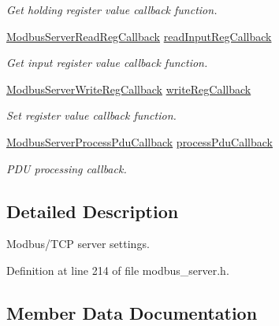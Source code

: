 \begin{DoxyCompactItemize}
\begin{DoxyCompactList}\small\item\em Get holding register value callback function. \end{DoxyCompactList}\item 
\hyperlink{modbus__server_8h_a3d9a52f0b248469bb1e36927cdb5ce91}{Modbus\+Server\+Read\+Reg\+Callback} \hyperlink{structModbusServerSettings_a1657429226ae26f0c0fe0c4f81d8c05f}{read\+Input\+Reg\+Callback}
\begin{DoxyCompactList}\small\item\em Get input register value callback function. \end{DoxyCompactList}\item 
\hyperlink{modbus__server_8h_a5ca8502fc8d19f45c85f28fdddb89d3e}{Modbus\+Server\+Write\+Reg\+Callback} \hyperlink{structModbusServerSettings_ab35e47bf928ab662f9c4782dddb05527}{write\+Reg\+Callback}
\begin{DoxyCompactList}\small\item\em Set register value callback function. \end{DoxyCompactList}\item 
\hyperlink{modbus__server_8h_a2ff9165ebf9788f21015a64c92cb6075}{Modbus\+Server\+Process\+Pdu\+Callback} \hyperlink{structModbusServerSettings_afec0a1863beec0c5d46bf137cf00d570}{process\+Pdu\+Callback}
\begin{DoxyCompactList}\small\item\em P\+DU processing callback. \end{DoxyCompactList}\end{DoxyCompactItemize}


\subsection{Detailed Description}
Modbus/\+T\+CP server settings. 

Definition at line 214 of file modbus\+\_\+server.\+h.



\subsection{Member Data Documentation}
\mbox{\label{structModbusServerSettings_a8a5b5283989b576e26a24e970b70eb32}} 
